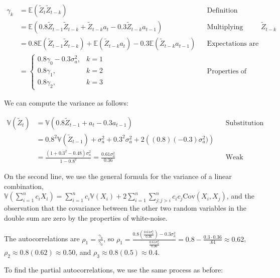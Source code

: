 \documentclass[12pt, letterpaper]{article}
\theoremstyle{definition}
\numberwithin{equation}{section}
\newcommand{\+}[1]{+_{\scalebox{.375}{#1}}}
\newcommand{\E}{\mathbb{E}}
\newcommand{\V}{\mathbb{V}}
\newcommand{\1}{\mathbbm{1}}
\begin{document}
\vspace{-0.5cm}
\begin{align*}
	\gamma_k&=\E(\tilde{Z}_t\tilde{Z}_{t-k}) &&\text{Definition}\\
	&=\E\left(0.8\tilde{Z}_{t-1}\tilde{Z}_{t-k}+\tilde{Z}_{t-k}a_t-0.3\tilde{Z}_{t-k}a_{t-1}\right) &&\text{Multiplying through by $\tilde{Z}_{t-k}$}\\
	&=0.8\E(\tilde{Z}_{t-1}\tilde{Z}_{t-k})+\E(\tilde{Z}_{t-k}a_t)-0.3\E(\tilde{Z}_{t-k}a_{t-1}) &&\text{Expectations are linear}\\
	&=\begin{cases}
		0.8\gamma_0-0.3\sigma_a^2, &\text{$k=1$}\\
		0.8\gamma_1, &\text{$k=2$}\\
		0.8\gamma_2, &k=3
	\end{cases} &&\text{Properties of white noise}
\end{align*}

We can compute the variance as follows:

\vspace{-0.5cm}
\begin{align*}
	\V(\tilde{Z}_t)&=\V\left(0.8\tilde{Z}_{t-1}+a_t-0.3a_{t-1}\right) &&\text{Substitution}\\
	&=0.8^2\V(\tilde{Z}_{t-1})+\sigma_a^2+0.3^2\sigma_a^2+2\left((0.8)(-0.3)\sigma_a^2)\right)\\
	&=\frac{(1+0.3^2-0.48)\sigma_a^2}{1-0.8^2}=\frac{0.61\sigma_a^2}{0.36} &&\text{Weak Stationarity}
\end{align*}

On the second line, we use the general formula for the variance of a linear combination, $\V\left(\sum\limits_{i=1}^{n}c_iX_i\right)=\sum\limits_{i=1}^{n}c_i\V(X_i)+2\sum\limits_{i=1}^{n}\sum\limits_{j: j>i}^{n}c_ic_j\text{Cov}(X_i, X_j)$, and the observation that the covariance between the other two random variables in the double sum are zero by the properties of white-noise.
\vspace{\baselineskip}

The autocorrelations are $\rho_1=\frac{\gamma_k}{\gamma_0}$, so $\rho_1=\frac{0.8\left(\frac{0.61\sigma_a^2}{0.36}\right)-0.3\sigma_a^2}{\frac{0.61\sigma_a^2}{0.36}}=0.8-\frac{0.3\cdot 0.36}{.61}\approx0.62$, $\rho_2\approx 0.8(0.62) \approx 0.50$, and $\rho_3\approx 0.8(0.5) \approx 0.4$.
\vspace{\baselineskip}

To find the partial autocorrelations, we use the same process as before:
\end{document}
